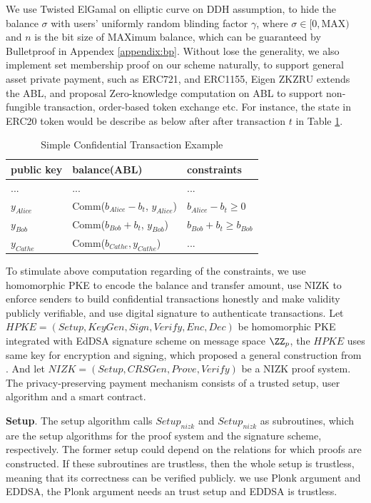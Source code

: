 \documentclass{article}
\begin{document}
We use Twisted ElGamal on elliptic curve on DDH assumption, to hide the balance $\sigma$ with users' uniformly random blinding factor $\gamma$, where $\sigma \in [0, \mbox{MAX})$ and $n$ is the bit size of \mbox{MAX}imum balance, which can be guaranteed by Bulletproof \cite{bunz2018bulletproofs} in Appendex \ref{appendix:bp}. Without lose the generality, we also implement set membership proof on our scheme naturally, to support general asset private payment, such as ERC721, and ERC1155, Eigen ZKZRU extends the ABL, and proposal Zero-knowledge computation on ABL to support non-fungible transaction, order-based token exchange etc. For instance, the state in ERC20 token would be describe as below after after transaction $t$ in Table \ref{tab:transfer}. 

\begin{table}
\centering
\begin{tabular}{l|l|l}
public key & balance(ABL) & constraints \\
\hline
... & ... & ...  \\
\hline
$y_{Alice}$  & Comm($b_{Alice} - b_t$, $y_{Alice}$) & $b_{Alice} - b_t \ge 0$ \\
\hline
$y_{Bob}$  & Comm($b_{Bob} + b_t$, $y_{Bob}$) & $b_{Bob} + b_t \ge b_{Bob} $  \\
\hline
$y_{Cathe}$  & Comm($b_{Cathe}, y_{Cathe}$) & ...   \\
\end{tabular}
\caption{\label{tab:transfer}Simple Confidential Transaction Example}
\end{table}

To stimulate above computation regarding of the constraints, we use homomorphic PKE to encode the balance and transfer amount, use NIZK to enforce senders to build confidential transactions honestly and make validity publicly verifiable, and use digital signature to authenticate transactions. Let $HPKE = (Setup, KeyGen, Sign, Verify, Enc, Dec)$ be homomorphic PKE integrated with EdDSA signature scheme on message space $\ZZ_p$, the $HPKE$ uses same key for encryption and signing, which proposed a general construction from \cite{paterson2011joint}. And let $NIZK = (Setup, CRSGen, Prove, Verify)$ be a NIZK proof system. The privacy-preserving payment mechanism consists of a trusted setup, user algorithm and a smart contract.

\textbf{Setup}. The setup algorithm calls $Setup_{nizk}$ and $Setup_{nizk}$ as subroutines, which are the setup algorithms for the proof system and the signature scheme, respectively. The former setup could depend on the relations for which proofs are constructed. If these subroutines are trustless, then the whole setup is trustless, meaning that its correctness can be verified publicly. we use Plonk argument and EDDSA, the Plonk argument needs an trust setup and EDDSA is trustless.
\end{document}
